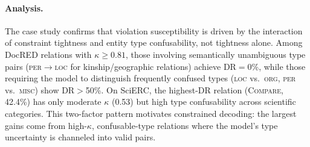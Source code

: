 \paragraph{Analysis.}
The case study confirms that violation susceptibility is driven by the interaction of constraint tightness and entity type confusability, not tightness alone.
Among DocRED relations with $\kappa \geq 0.81$, those involving semantically unambiguous type pairs (\textsc{per}$\to$\textsc{loc} for kinship/geographic relations) achieve DR${=}$0\%, while those requiring the model to distinguish frequently confused types (\textsc{loc} vs.\ \textsc{org}, \textsc{per} vs.\ \textsc{misc}) show DR${>}$50\%.
On SciERC, the highest-DR relation (\textsc{Compare}, 42.4\%) has only moderate $\kappa$ (0.53) but high type confusability across scientific categories.
This two-factor pattern motivates constrained decoding: the largest gains come from high-$\kappa$, confusable-type relations where the model's type uncertainty is channeled into valid pairs.
